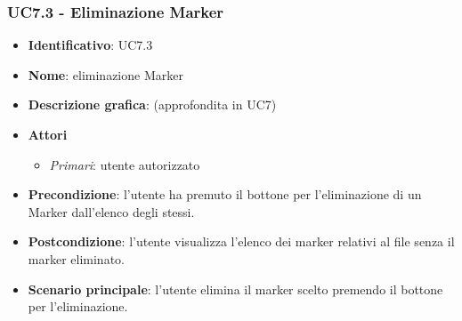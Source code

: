 \subsubsection{UC7.3 - Eliminazione Marker}
\begin{itemize}
  \item \textbf{Identificativo}: UC7.3
  \item \textbf{Nome}: eliminazione Marker
  \item \textbf{Descrizione grafica}: (approfondita in UC7)
  \item \textbf{Attori}
        \begin{itemize}
          \item \textit{Primari}: utente autorizzato
        \end{itemize}
  \item \textbf{Precondizione}: l'utente ha premuto il bottone per l'eliminazione di un Marker dall'elenco degli stessi.
  \item \textbf{Postcondizione}: l'utente visualizza l'elenco dei marker relativi al file senza il marker eliminato.
  \item \textbf{Scenario principale}: l'utente elimina il marker scelto premendo il bottone per l'eliminazione.
\end{itemize}